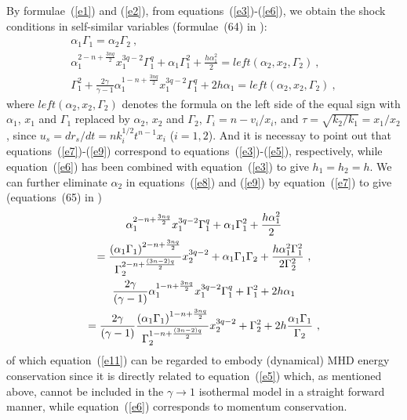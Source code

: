 \documentclass[fleqn,usenatbib]{mnras}
\begin{document}
By formulae~(\ref{e1}) and (\ref{e2}), from equations~(\ref{e3})-(\ref{e6}), we obtain the shock conditions in self-similar variables (formulae~(64) in \citet{wang2008dynamic}):
\begin{gather}
\alpha_{1}\Gamma_{1}=\alpha_{2}\Gamma_{2}\ ,\label{e7}\\
\alpha_{1}^{2-n+\frac{3nq}{2}}x_{1}^{3q-2}\Gamma_{1}^{q}+\alpha_{1}\Gamma_{1}^{2}+\frac{h\alpha_{1}^{2}}{2}=left(\alpha_{2},x_{2},\Gamma_{2})\ ,\label{e8}\\
\Gamma_{1}^{2}+\frac{2\gamma}{\gamma-1}\alpha_{1}^{1-n+\frac{3nq}{2}}x_{1}^{3q-2}\Gamma_{1}^{q}+2h\alpha_{1}=left(\alpha_{2},x_{2},\Gamma_{2})\ ,\label{e9}
\end{gather}
where $left(\alpha_{2},x_{2},\Gamma_{2})$ denotes the formula on the left side of the equal sign with $\alpha_{1}$, $x_{1}$ and $\Gamma_{1}$ replaced by $\alpha_{2}$, $x_{2}$ and $\Gamma_{2}$, $\Gamma_{i}=n-v_{i}/x_{i}$, and $\tau=\sqrt{k_{2}/k_{1}}=x_{1}/x_{2}$, since $u_{s}=dr_{s}/dt=nk_{i}^{1/2}t^{n-1}x_{i}$ ($i=1,2$). And it is necessay to point out that equations~(\ref{e7})-(\ref{e9}) correspond to equations~(\ref{e3})-(\ref{e5}), respectively, while equation~(\ref{e6}) has been combined with equation~(\ref{e3}) to give $h_{1}=h_{2}=h$. We can further eliminate $\alpha_{2}$ in equations~(\ref{e8}) and (\ref{e9}) by equation~(\ref{e7}) to give (equations~(65) in \citet{wang2008dynamic})
\begin{gather}
\alpha_{1}^{2-n+\frac{3nq}{2}}x_{1}^{3q-2}\Gamma_{1}^{q}+\alpha_{1}\Gamma_{1}^{2}+\frac{h\alpha_{1}^{2}}{2}\notag\\
=\frac{\left(\alpha_{1}\Gamma_{1}\right)^{2-n+\frac{3nq}{2}}}{\Gamma_{2}^{2-n+\frac{(3n-2)q}{2}}}x_{2}^{3q-2}+\alpha_{1}\Gamma_{1}\Gamma_{2}+\frac{h\alpha_{1}^{2}\Gamma_{1}^{2}}{2\Gamma_{2}^{2}}\ ,\label{e10}\\
\frac{2\gamma}{(\gamma-1)}\alpha_{1}^{1-n+\frac{3nq}{2}}x_{1}^{3q-2}\Gamma_{1}^{q}+\Gamma_{1}^{2}+2h\alpha_{1}\notag\\
=\frac{2\gamma}{(\gamma-1)}\frac{\left(\alpha_{1}\Gamma_{1}\right)^{1-n+\frac{3nq}{2}}}{\Gamma_{2}^{1-n+\frac{(3n-2)q}{2}}}x_{2}^{3q-2}+\Gamma_{2}^{2}+2h\frac{\alpha_{1}\Gamma_{1}}{\Gamma_{2}}\ ,\label{e11}
\end{gather}
of which equation~(\ref{e11}) can be regarded to embody (dynamical) MHD energy conservation since it is directly related to equation~(\ref{e5}) which, as mentioned above, cannot be included in the $\gamma\rightarrow 1$ isothermal model in a straight forward manner, while equation~(\ref{e6}) corresponds to momentum conservation.
\end{document}
